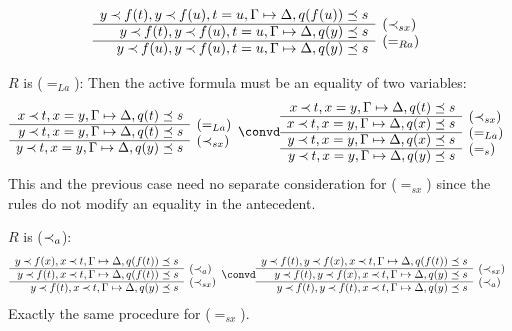 \begin{PROOF}
\begin{LS}
\[%
 \begin{array}{rl}
 y\Incl f(t), y\Incl f(u), t=u, \GSD, q(f(u))\preceq s \\ \cline{1-1}
 y\Incl f(t), y\Incl f(u), t=u, \GSD, q(y)\preceq s & \rabove{(\Incl_{sx})} \\ \cline{1-1}
 y\Incl f(u), y\Incl f(u), t=u, \GSD, q(y)\preceq s & \rabove{(=_{Ra})} \end{array} \]
%
\item $R$ is ($=_{La}$):
Then the active formula must be an equality of two variables:
\[ \begin{array}{rl}
 x\Incl t, x=y, \GSD, q(t)\preceq s \\ \cline{1-1}
 y\Incl t, x=y, \GSD, q(t)\preceq s & \rabove{(=_{La})} \\ \cline{1-1}
 y\Incl t, x=y, \GSD, q(y)\preceq s & \rabove{(\Incl_{sx})} \end{array} \convd
 \begin{array}{rl}
 x\Incl t, x=y, \GSD, q(t)\preceq s \\ \cline{1-1}
 x\Incl t, x=y, \GSD, q(x)\preceq s & \rabove{(\Incl_{sx})} \\ \cline{1-1}
 y\Incl t, x=y, \GSD, q(x)\preceq s & \rabove{(=_{La})} \\ \cline{1-1}
 y\Incl t, x=y, \GSD, q(y)\preceq s & \rabove{(=_s)} \end{array} \]
This and the previous case need no separate consideration for ($=_{sx}$)
since the rules do not modify an equality in the antecedent.
%
\item $R$ is ($\mathbin{\prec}_a$):
\[ \begin{array}{rl}
 y\Incl f(x), x\Incl t, \GSD, q(f(t))\preceq s \\ \cline{1-1}
 y\Incl f(t), x\Incl t, \GSD, q(f(t))\preceq s & \rabove{(\Incl_a)} \\ \cline{1-1}
 y\Incl f(t), x\Incl t, \GSD, q(y)\preceq s & \rabove{(\Incl_{sx})} \end{array} \convd
 \begin{array}{rl}
 y\Incl f(t), y\Incl f(x), x\Incl t, \GSD, q(f(t))\preceq s \\ \cline{1-1}
 y\Incl f(t), y\Incl f(x), x\Incl t, \GSD, q(y)\preceq s & \rabove{(\Incl_{sx})} \\ \cline{1-1}
 y\Incl f(t), y\Incl f(t), x\Incl t, \GSD, q(y)\preceq s & \rabove{(\Incl_a)}
 \end{array} \]
Exactly the same procedure for ($=_{sx}$).

\end{LS}
\end{PROOF}
